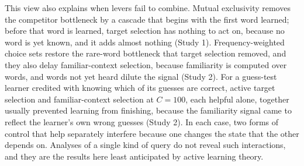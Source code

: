 \documentclass[a4paper,natbib,man]{apa6}
\begin{document}
This view also explains when levers fail to combine. Mutual exclusivity removes the competitor bottleneck by a cascade that begins with the first word learned; before that word is learned, target selection has nothing to act on, because no word is yet known, and it adds almost nothing (Study 1). Frequency-weighted choice sets restore the rare-word bottleneck that target selection removed, and they also delay familiar-context selection, because familiarity is computed over words, and words not yet heard dilute the signal (Study 2). For a guess-test learner credited with knowing which of its guesses are correct, active target selection and familiar-context selection at $C=100$, each helpful alone, together usually prevented learning from finishing, because the familiarity signal came to reflect the learner's own wrong guesses (Study 2). In each case, two forms of control that help separately interfere because one changes the state that the other depends on. Analyses of a single kind of query do not reveal such interactions, and they are the results here least anticipated by active learning theory.
\end{document}
